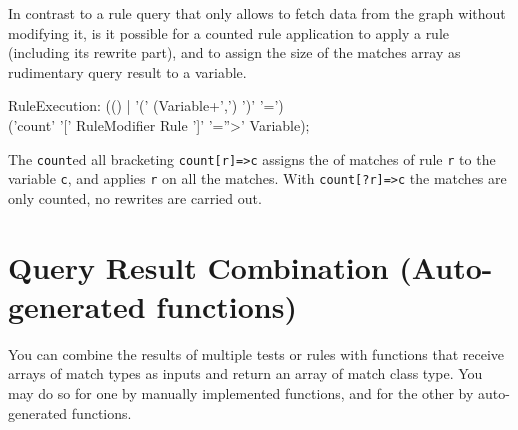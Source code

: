 In contrast to a rule query that only allows to fetch data from the graph without modifying it, is it possible for a counted rule application to apply a rule (including its rewrite part), and to assign the size of the matches array as rudimentary query result to a variable.

\begin{rail}
  RuleExecution: (() 
	| '(' (Variable+',') ')' '=') \\ ('count' '[' RuleModifier Rule ']' '=''>' Variable);
\end{rail}

The \texttt{count}ed all bracketing \texttt{count[r]=>c} assigns the  of matches of rule \texttt{r} to the variable \texttt{c}, and applies \texttt{r} on all the matches.
With \texttt{count[?r]=>c} the matches are only counted, no rewrites are carried out.


\section{Query Result Combination (Auto-generated functions)}

You can combine the results of multiple tests or rules with functions that receive arrays of match types as inputs and return an array of match class type.
You may do so for one by manually implemented functions, and for the other by auto-generated functions.

